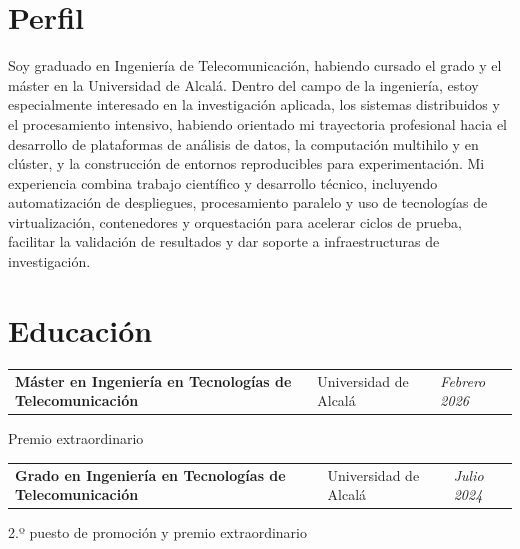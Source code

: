 \section{Perfil}
\begin{onecolentry}
	Soy graduado en Ingeniería de Telecomunicación, habiendo cursado el grado y el máster en la Universidad de Alcalá. Dentro del campo de la ingeniería, estoy especialmente interesado en la investigación aplicada, los sistemas distribuidos y el procesamiento intensivo, habiendo orientado mi trayectoria profesional hacia el desarrollo de plataformas de análisis de datos, la computación multihilo y en clúster, y la construcción de entornos reproducibles para experimentación. Mi experiencia combina trabajo científico y desarrollo técnico, incluyendo automatización de despliegues, procesamiento paralelo y uso de tecnologías de virtualización, contenedores y orquestación para acelerar ciclos de prueba, facilitar la validación de resultados y dar soporte a infraestructuras de investigación.
\end{onecolentry}

\vspace{-5pt}

\section{Educación}

\begin{onecolentry}
	\begin{tabularx}{\textwidth}{@{}>{\raggedright\arraybackslash}X>{\raggedright\arraybackslash}p{3.6cm}>{\raggedleft\arraybackslash}p{2.4cm}@{}}
		\textbf{Máster en Ingeniería en Tecnologías de Telecomunicación} & Universidad de Alcalá & \textit{Febrero 2026}
	\end{tabularx}
	
	\vspace{0.05 cm}
	\hspace{0.2cm}Premio extraordinario
\end{onecolentry}

\vspace{0.2 cm}

\begin{onecolentry}
	\begin{tabularx}{\textwidth}{@{}>{\raggedright\arraybackslash}X>{\raggedright\arraybackslash}p{3.6cm}>{\raggedleft\arraybackslash}p{2.4cm}@{}}
		\textbf{Grado en Ingeniería en Tecnologías de Telecomunicación} & Universidad de Alcalá & \textit{Julio 2024}
	\end{tabularx}
	
	\vspace{0.05 cm}
	\hspace{0.2cm}2.º puesto de promoción y premio extraordinario
\end{onecolentry}

